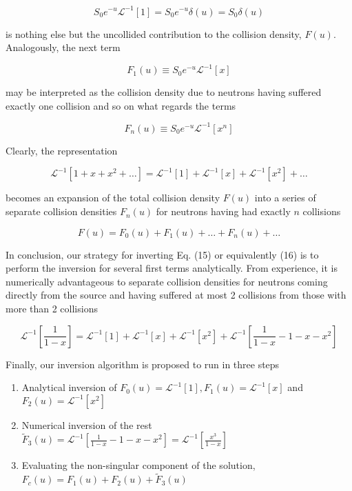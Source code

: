 \documentclass[10pt]{article}
\begin{document}
$$
S_{0} e^{-u} \mathcal{L}^{-1}[1]=S_{0} e^{-u} \delta(u)=S_{0} \delta(u)
$$

is nothing else but the uncollided contribution to the collision density, $F(u)$. Analogously, the next term

$$
F_{1}(u) \equiv S_{0} e^{-u} \mathcal{L}^{-1}[x]
$$

may be interpreted as the collision density due to neutrons having suffered exactly one collision and so on what regards the terms

$$
F_{n}(u) \equiv S_{0} e^{-u} \mathcal{L}^{-1}\left[x^{n}\right]
$$

Clearly, the representation

$$
\mathcal{L}^{-1}\left[1+x+x^{2}+\ldots\right]=\mathcal{L}^{-1}[1]+\mathcal{L}^{-1}[x]+\mathcal{L}^{-1}\left[x^{2}\right]+\ldots
$$

becomes an expansion of the total collision density $F(u)$ into a series of separate collision densities $F_{n}(u)$ for neutrons having had exactly $n$ collisions

$$
F(u)=F_{0}(u)+F_{1}(u)+\ldots+F_{n}(u)+\ldots
$$

In conclusion, our strategy for inverting Eq. (15) or equivalently (16) is to perform the inversion for several first terms analytically. From experience, it is numerically advantageous to separate collision densities for neutrons coming directly from the source and having suffered at most 2 collisions from those with more than 2 collisions

$$
\mathcal{L}^{-1}\left[\frac{1}{1-x}\right]=\mathcal{L}^{-1}[1]+\mathcal{L}^{-1}[x]+\mathcal{L}^{-1}\left[x^{2}\right]+\mathcal{L}^{-1}\left[\frac{1}{1-x}-1-x-x^{2}\right]
$$

Finally, our inversion algorithm is proposed to run in three steps

\begin{enumerate}
  \item Analytical inversion of $F_{0}(u)=\mathcal{L}^{-1}[1], F_{1}(u)=\mathcal{L}^{-1}[x]$ and $F_{2}(u)=\mathcal{L}^{-1}\left[x^{2}\right]$

  \item Numerical inversion of the rest $\tilde{F}_{3}(u)=\mathcal{L}^{-1}\left[\frac{1}{1-x}-1-x-x^{2}\right]=\mathcal{L}^{-1}\left[\frac{x^{3}}{1-x}\right]$

  \item Evaluating the non-singular component of the solution, $F_{c}(u)=F_{1}(u)+F_{2}(u)+\tilde{F}_{3}(u)$

\end{enumerate}
\end{document}
